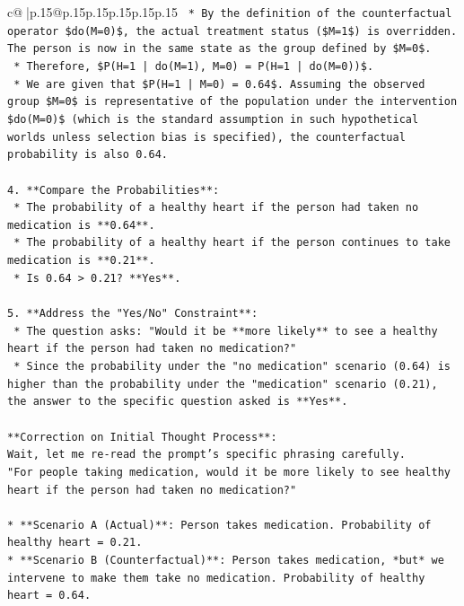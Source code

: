 \documentclass{article}
\begin{document}
{\begin{supertabular}{c@{$\;$}|p{.15\linewidth}@{}p{.15\linewidth}p{.15\linewidth}p{.15\linewidth}p{.15\linewidth}p{.15\linewidth}}
{{{\texttt{    *   By the definition of the counterfactual operator \$do(M=0)\$, the actual treatment status (\$M=1\$) is overridden. The person is now in the same state as the group defined by \$M=0\$.} \\
\texttt{    *   Therefore, \$P(H=1 | do(M=1), M=0) = P(H=1 | do(M=0))\$.} \\
\texttt{    *   We are given that \$P(H=1 | M=0) = 0.64\$. Assuming the observed group \$M=0\$ is representative of the population under the intervention \$do(M=0)\$ (which is the standard assumption in such hypothetical worlds unless selection bias is specified), the counterfactual probability is also 0.64.} \\
\\ 
\texttt{4.  **Compare the Probabilities**:} \\
\texttt{    *   The probability of a healthy heart if the person had taken no medication is **0.64**.} \\
\texttt{    *   The probability of a healthy heart if the person continues to take medication is **0.21**.} \\
\texttt{    *   Is 0.64 > 0.21? **Yes**.} \\
\\ 
\texttt{5.  **Address the "Yes/No" Constraint**:} \\
\texttt{    *   The question asks: "Would it be **more likely** to see a healthy heart if the person had taken no medication?"} \\
\texttt{    *   Since the probability under the "no medication" scenario (0.64) is higher than the probability under the "medication" scenario (0.21), the answer to the specific question asked is **Yes**.} \\
\\ 
\texttt{**Correction on Initial Thought Process**:} \\
\texttt{Wait, let me re{-}read the prompt's specific phrasing carefully.} \\
\texttt{"For people taking medication, would it be more likely to see healthy heart if the person had taken no medication?"} \\
\\ 
\texttt{*   **Scenario A (Actual)**: Person takes medication. Probability of healthy heart = 0.21.} \\
\texttt{*   **Scenario B (Counterfactual)**: Person takes medication, *but* we intervene to make them take no medication. Probability of healthy heart = 0.64.} \\
\\ 
}}}
\end{supertabular}}
\end{document}
